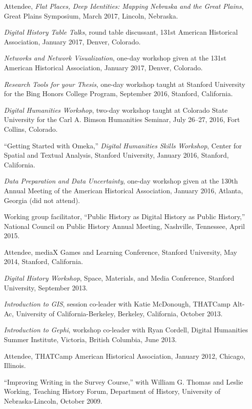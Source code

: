 Attendee, \emph{Flat Places, Deep Identities: Mapping Nebraska and the
Great Plains}, Great Plains Symposium, March 2017, Lincoln, Nebraska.

\emph{Digital History Table Talks}, round table discussant, 131st
American Historical Association, January 2017, Denver, Colorado.

\emph{Networks and Network Visualization}, one-day workshop given at the
131st American Historical Association, January 2017, Denver, Colorado.

\emph{Research Tools for your Thesis}, one-day workshop taught at
Stanford University for the Bing Honors College Program, September 2016,
Stanford, California.

\emph{Digital Humanities Workshop}, two-day workshop taught at Colorado
State University for the Carl A. Bimson Humanities Seminar, July 26--27,
2016, Fort Collins, Colorado.

``Getting Started with Omeka,'' \emph{Digital Humanities Skills
Workshop}, Center for Spatial and Textual Analysis, Stanford University,
January 2016, Stanford, California.

\emph{Data Preparation and Data Uncertainty}, one-day workshop given at
the 130th Annual Meeting of the American Historical Association, January
2016, Atlanta, Georgia (did not attend).

Working group facilitator, ``Public History as Digital History as Public
History,'' National Council on Public History Annual Meeting, Nashville,
Tennessee, April 2015.

Attendee, mediaX Games and Learning Conference, Stanford University, May
2014, Stanford, California.

\emph{Digital History Workshop}, Space, Materials, and Media Conference,
Stanford University, September 2013.

\emph{Introduction to GIS}, session co-leader with Katie McDonough,
THATCamp Alt-Ac, University of California-Berkeley, Berkeley,
California, October 2013.

\emph{Introduction to Gephi}, workshop co-leader with Ryan Cordell,
Digital Humanities Summer Institute, Victoria, British Columbia, June
2013.

Attendee, THATCamp American Historical Association, January 2012,
Chicago, Illinois.

``Improving Writing in the Survey Course,'' with William G. Thomas and
Leslie Working, Teaching History Forum, Department of History,
University of Nebraska-Lincoln, October 2009.


